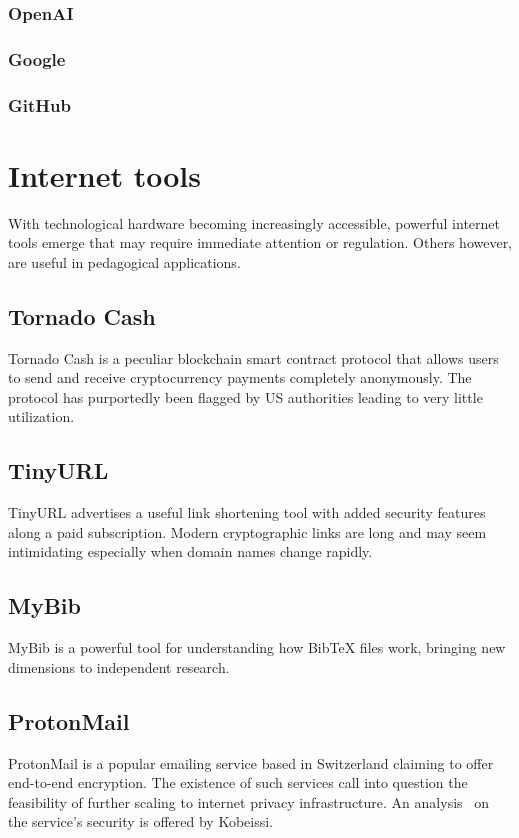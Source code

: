 \documentclass[11pt]{article}
\begin{document}
\subsubsection{OpenAI}
\subsubsection{Google}
\subsubsection{GitHub}

\section{Internet tools}
With technological hardware becoming increasingly accessible, powerful internet tools emerge that may require immediate attention or regulation. Others however, are useful in pedagogical applications.
\subsection{Tornado Cash~\cite{nadler_2023_tornado}~\cite{pertsev_2019_tornado}}
Tornado Cash is a peculiar blockchain smart contract protocol that allows users to send and receive cryptocurrency payments completely anonymously. The protocol has purportedly been flagged by US authorities leading to very little utilization.
\subsection{TinyURL~\cite{a2019_tinyurlcom}}
TinyURL advertises a useful link shortening tool with added security features along a paid subscription. Modern cryptographic links are long and may seem intimidating especially when domain names change rapidly.
\subsection{MyBib~\cite{mybib_2018_mybib}}
MyBib is a powerful tool for understanding how BibTeX files work, bringing new dimensions to independent research.
\subsection{ProtonMail~\cite{kobeissi_2018_an}}
ProtonMail is a popular emailing service based in Switzerland claiming to offer end-to-end encryption. The existence of such services call into question the feasibility of further scaling to internet privacy infrastructure. An analysis~\cite{kobeissi_2018_an} on the service's security is offered by Kobeissi.
\end{document}
